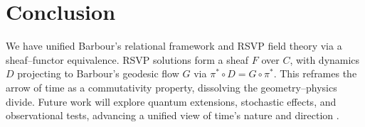 \documentclass[11pt]{article}
\begin{document}
\section{Conclusion}
We have unified Barbour’s relational framework and RSVP field theory via a sheaf–functor equivalence. RSVP solutions form a sheaf $F$ over $C$, with dynamics $D$ projecting to Barbour’s geodesic flow $G$ via $\pi^* \circ D = G \circ \pi^*$. This reframes the arrow of time as a commutativity property, dissolving the geometry–physics divide. Future work will explore quantum extensions, stochastic effects, and observational tests, advancing a unified view of time’s nature and direction \citep{Barbour1999, Rovelli2004}.



\end{document}
